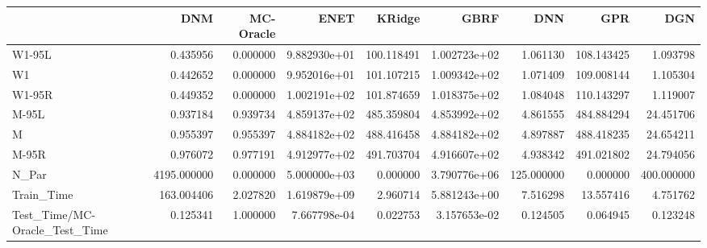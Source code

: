 \begin{tabular}{lrrrrrrrr}
\toprule
{} &          DNM &  MC-Oracle &          ENET &      KRidge &          GBRF &         DNN &         GPR &         DGN \\
\midrule
W1-95L                        &     0.435956 &   0.000000 &  9.882930e+01 &  100.118491 &  1.002723e+02 &    1.061130 &  108.143425 &    1.093798 \\
W1                            &     0.442652 &   0.000000 &  9.952016e+01 &  101.107215 &  1.009342e+02 &    1.071409 &  109.008144 &    1.105304 \\
W1-95R                        &     0.449352 &   0.000000 &  1.002191e+02 &  101.874659 &  1.018375e+02 &    1.084048 &  110.143297 &    1.119007 \\
M-95L                         &     0.937184 &   0.939734 &  4.859137e+02 &  485.359804 &  4.853992e+02 &    4.861555 &  484.884294 &   24.451706 \\
M                             &     0.955397 &   0.955397 &  4.884182e+02 &  488.416458 &  4.884182e+02 &    4.897887 &  488.418235 &   24.654211 \\
M-95R                         &     0.976072 &   0.977191 &  4.912977e+02 &  491.703704 &  4.916607e+02 &    4.938342 &  491.021802 &   24.794056 \\
N\_Par                         &  4195.000000 &   0.000000 &  5.000000e+03 &    0.000000 &  3.790776e+06 &  125.000000 &    0.000000 &  400.000000 \\
Train\_Time                    &   163.004406 &   2.027820 &  1.619879e+09 &    2.960714 &  5.881243e+00 &    7.516298 &   13.557416 &    4.751762 \\
Test\_Time/MC-Oracle\_Test\_Time &     0.125341 &   1.000000 &  7.667798e-04 &    0.022753 &  3.157653e-02 &    0.124505 &    0.064945 &    0.123248 \\
\bottomrule
\end{tabular}
